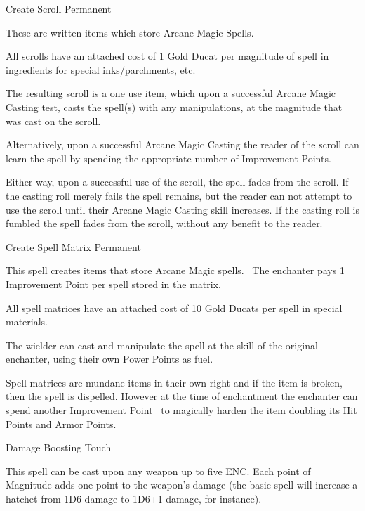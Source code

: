 \begin{samepage}
\begin{rpg-spell}
\end{rpg-spell}
\end{samepage}


\begin{samepage}
\begin{rpg-spell}
{Create Scroll}
{Permanent}

These are written items which store Arcane Magic Spells.

All scrolls have an attached cost of 1 Gold Ducat per magnitude of spell in ingredients for special inks/parchments, etc.

The resulting scroll is a one use item, which upon a successful Arcane Magic Casting test, casts the spell(s) with any manipulations, at the magnitude that was cast on the scroll.

Alternatively, upon a successful Arcane Magic Casting the reader of the scroll can learn the spell by spending the appropriate number of Improvement Points.

Either way, upon a successful use of the scroll, the spell fades from the scroll. If the casting roll merely fails the spell remains, but the reader can not attempt to use the scroll until their Arcane Magic Casting skill increases. If the casting roll is fumbled the spell fades from the scroll, without any benefit to the reader.
\end{rpg-spell}
\end{samepage}


\begin{samepage}
\begin{rpg-spell}
{Create Spell Matrix}
{Permanent}

This spell creates items that store Arcane Magic spells. 
The enchanter pays 1 Improvement Point per spell stored in the matrix.

All spell matrices have an attached cost of 10 Gold Ducats per spell in special materials.

The wielder can cast and manipulate the spell at the skill of the original enchanter, using their own Power Points as fuel.

Spell matrices are mundane items in their own right and if the item is broken, then the spell is dispelled. However at the time of enchantment the enchanter can spend another Improvement Point  to magically harden the item doubling its Hit Points and Armor Points.
\end{rpg-spell}
\end{samepage}

\begin{samepage}
\begin{rpg-spell}
{Damage Boosting}
{Touch}

This spell can be cast upon any weapon up to five ENC. Each point of Magnitude adds one point to the weapon’s damage (the basic spell will increase a hatchet from 1D6 damage to 1D6+1 damage, for instance). 
\end{rpg-spell}
\end{samepage}


